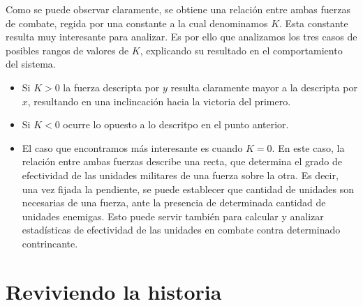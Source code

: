 \documentclass{sig-alternate}
\begin{document}
Como se puede observar claramente, se obtiene una relación entre ambas fuerzas de combate, regida por una constante a la cual denominamos $K$. 
Esta constante resulta muy interesante para analizar. Es por ello que analizamos los tres casos de posibles rangos de valores de $K$, explicando
su resultado en el comportamiento del sistema.
\begin{itemize}
\item Si $K>0$ la fuerza descripta por $y$ resulta claramente mayor a la descripta por $x$, resultando en una inclincación hacia la victoria
del primero.
\item Si $K<0$ ocurre lo opuesto a lo descritpo en el punto anterior.
\item El caso que encontramos más interesante es cuando $K=0$. En este caso, la relación entre ambas fuerzas describe una recta, que determina
el grado de efectividad de las unidades militares de una fuerza sobre la otra. Es decir, una vez fijada la pendiente, se puede establecer que
cantidad de unidades son necesarias de una fuerza, ante la presencia de determinada cantidad de unidades enemigas. Esto puede servir también
para calcular y analizar estadísticas de efectividad de las unidades en combate contra determinado contrincante.
\end{itemize}



\section{Reviviendo la historia}
\end{document}
